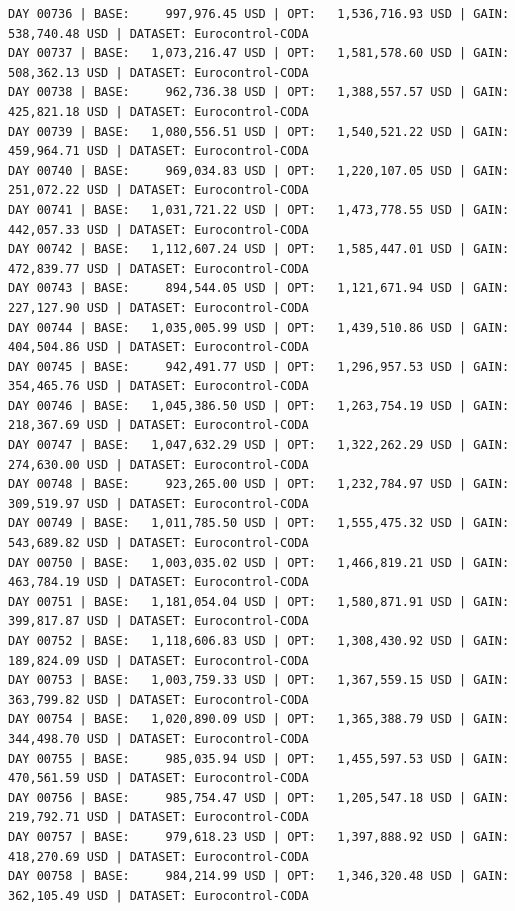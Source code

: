 \documentclass[11pt,a4paper]{article}
\begin{document}
\begin{verbatim}
DAY 00736 | BASE:     997,976.45 USD | OPT:   1,536,716.93 USD | GAIN: 538,740.48 USD | DATASET: Eurocontrol-CODA
DAY 00737 | BASE:   1,073,216.47 USD | OPT:   1,581,578.60 USD | GAIN: 508,362.13 USD | DATASET: Eurocontrol-CODA
DAY 00738 | BASE:     962,736.38 USD | OPT:   1,388,557.57 USD | GAIN: 425,821.18 USD | DATASET: Eurocontrol-CODA
DAY 00739 | BASE:   1,080,556.51 USD | OPT:   1,540,521.22 USD | GAIN: 459,964.71 USD | DATASET: Eurocontrol-CODA
DAY 00740 | BASE:     969,034.83 USD | OPT:   1,220,107.05 USD | GAIN: 251,072.22 USD | DATASET: Eurocontrol-CODA
DAY 00741 | BASE:   1,031,721.22 USD | OPT:   1,473,778.55 USD | GAIN: 442,057.33 USD | DATASET: Eurocontrol-CODA
DAY 00742 | BASE:   1,112,607.24 USD | OPT:   1,585,447.01 USD | GAIN: 472,839.77 USD | DATASET: Eurocontrol-CODA
DAY 00743 | BASE:     894,544.05 USD | OPT:   1,121,671.94 USD | GAIN: 227,127.90 USD | DATASET: Eurocontrol-CODA
DAY 00744 | BASE:   1,035,005.99 USD | OPT:   1,439,510.86 USD | GAIN: 404,504.86 USD | DATASET: Eurocontrol-CODA
DAY 00745 | BASE:     942,491.77 USD | OPT:   1,296,957.53 USD | GAIN: 354,465.76 USD | DATASET: Eurocontrol-CODA
DAY 00746 | BASE:   1,045,386.50 USD | OPT:   1,263,754.19 USD | GAIN: 218,367.69 USD | DATASET: Eurocontrol-CODA
DAY 00747 | BASE:   1,047,632.29 USD | OPT:   1,322,262.29 USD | GAIN: 274,630.00 USD | DATASET: Eurocontrol-CODA
DAY 00748 | BASE:     923,265.00 USD | OPT:   1,232,784.97 USD | GAIN: 309,519.97 USD | DATASET: Eurocontrol-CODA
DAY 00749 | BASE:   1,011,785.50 USD | OPT:   1,555,475.32 USD | GAIN: 543,689.82 USD | DATASET: Eurocontrol-CODA
DAY 00750 | BASE:   1,003,035.02 USD | OPT:   1,466,819.21 USD | GAIN: 463,784.19 USD | DATASET: Eurocontrol-CODA
DAY 00751 | BASE:   1,181,054.04 USD | OPT:   1,580,871.91 USD | GAIN: 399,817.87 USD | DATASET: Eurocontrol-CODA
DAY 00752 | BASE:   1,118,606.83 USD | OPT:   1,308,430.92 USD | GAIN: 189,824.09 USD | DATASET: Eurocontrol-CODA
DAY 00753 | BASE:   1,003,759.33 USD | OPT:   1,367,559.15 USD | GAIN: 363,799.82 USD | DATASET: Eurocontrol-CODA
DAY 00754 | BASE:   1,020,890.09 USD | OPT:   1,365,388.79 USD | GAIN: 344,498.70 USD | DATASET: Eurocontrol-CODA
DAY 00755 | BASE:     985,035.94 USD | OPT:   1,455,597.53 USD | GAIN: 470,561.59 USD | DATASET: Eurocontrol-CODA
DAY 00756 | BASE:     985,754.47 USD | OPT:   1,205,547.18 USD | GAIN: 219,792.71 USD | DATASET: Eurocontrol-CODA
DAY 00757 | BASE:     979,618.23 USD | OPT:   1,397,888.92 USD | GAIN: 418,270.69 USD | DATASET: Eurocontrol-CODA
DAY 00758 | BASE:     984,214.99 USD | OPT:   1,346,320.48 USD | GAIN: 362,105.49 USD | DATASET: Eurocontrol-CODA

\end{verbatim}
\end{document}
